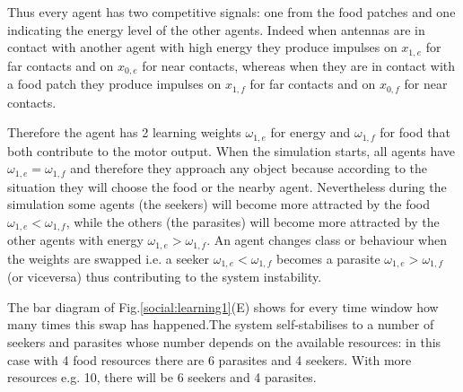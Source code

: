 Thus every agent has two competitive signals:
one from the food patches and one indicating the energy level of the other agents.
Indeed when antennas are in contact with another agent with high energy they produce
impulses on $x_{1,e}$ for far contacts and on $x_{0,e}$ for near contacts,
whereas when they are in contact with a food patch they produce impulses on $x_{1,f}$
for far contacts and on $x_{0,f}$ for near contacts.

Therefore the agent has 2 learning weights $\omega_{1,e}$ for energy and $\omega_{1,f}$
for food that both contribute to the motor output. When the simulation starts,
all agents have $\omega_{1,e}=\omega_{1,f}$ and therefore they approach any object because
according to the situation they will choose the food or the nearby agent.
Nevertheless during the simulation some agents (the seekers) will become more
attracted by the food  $\omega_{1,e}<\omega_{1,f}$, while the others (the parasites)
will become more attracted by the other agents with energy $\omega_{1,e}>\omega_{1,f}$.
An agent changes class or behaviour when the weights are swapped 
i.e. a seeker $\omega_{1,e}<\omega_{1,f}$ becomes a parasite $\omega_{1,e}>\omega_{1,f}$
(or viceversa) thus contributing to the system instability.

The bar diagram of Fig.\ref{social:learning1}(E) shows for every time window how
many times this swap has happened.The system self-stabilises to a number of seekers
and parasites whose number depends on the available resources:
in this case with 4 food resources there are 6 parasites and 4 seekers.
With more resources e.g. 10, there will be 6 seekers and 4 parasites.

